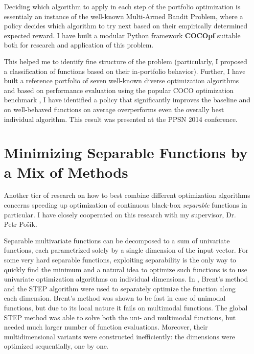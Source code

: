 Deciding which algorithm to apply in each step of the portfolio
optimization is essentialy an instance of the well-known Multi-Armed
Bandit Problem, where a policy decides which algorithm to try next
based on their empirically determined expected reward.
I have built a modular Python framework \textbf{COCOpf} \citep{COCOpf}
suitable both for research and application of this problem.

This helped me to identify fine structure of the problem
(particularly, I proposed a classification of functions based on
their in-portfolio behavior).
Further, I have built a reference portfolio of seven well-known
diverse optimization algorithms and based on performance evaluation
using the popular COCO optimization benchmark \citep{COCO1}, I have
identified a policy that significantly improves the baseline and
on well-behaved functions on average overperforms even the overally
best individual algorithm. This result was presented at the
PPSN 2014 conference. \citep{optpf}

\section{Minimizing Separable Functions by a Mix of Methods}

Another tier of research on how to best combine different optimization
algorithms concerns speeding up optimization of continuous black-box
\textit{separable} functions in particular.  I have closely cooperated
on this research with my supervisor, Dr. Petr Pošík.

Separable multivariate functions can be decomposed to a sum of univariate
functions, each parametrized solely by a single dimension of the input
vector.
For some very hard separable functions, exploiting separability
is the only way to quickly find the minimum and a natural idea to optimize
such functions is to use univariate optimization algorithms on individual
dimensions.
In \citep{PosikGECCO2009LineSearch}, Brent's method \citep{Brent1973} and the STEP algorithm \citep{STEP} were used to separately optimize the function along each dimension.
Brent's method was shown to be fast in case of unimodal functions, but due to its local nature it fails on multimodal functions.
The global STEP method was able to solve both the uni- and multimodal functions, but needed much larger number of function evaluations.
Moreover, their multidimensional variants were constructed inefficiently: the dimensions were optimized sequentially, one by one.

